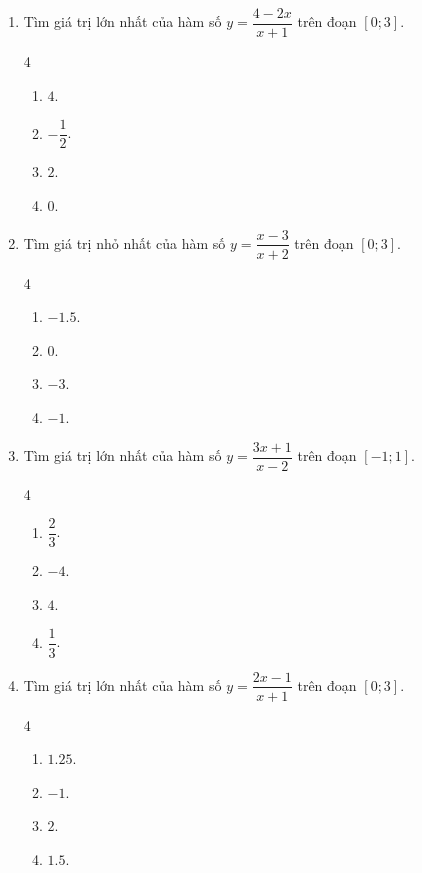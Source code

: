 \documentclass[12pt]{article}
\begin{document}
\begin{enumerate}[label=\textbf{Câu \arabic*.}]
		\item Tìm giá trị lớn nhất của hàm số $y = \dfrac{4 - 2x}{x + 1}$ trên đoạn $[0; 3]$.
		\begin{multicols}{4}
			\begin{enumerate}[label=\textbf{\Alph*.}]
				\item $4$.
				\item $-\dfrac{1}{2}$.
				\item $2$.
				\item $0$.
			\end{enumerate}
		\end{multicols}
		
		\item Tìm giá trị nhỏ nhất của hàm số $y = \dfrac{x - 3}{x + 2}$ trên đoạn $[0; 3]$.
		\begin{multicols}{4}
			\begin{enumerate}[label=\textbf{\Alph*.}]
				\item $-1.5$.
				\item $0$.
				\item $-3$.
				\item $-1$.
			\end{enumerate}
		\end{multicols}
		
		\item Tìm giá trị lớn nhất của hàm số $y = \dfrac{3x + 1}{x - 2}$ trên đoạn $[-1; 1]$.
		\begin{multicols}{4}
			\begin{enumerate}[label=\textbf{\Alph*.}]
				\item $\dfrac{2}{3}$.
				\item $-4$.
				\item $4$.
				\item $\dfrac{1}{3}$.
			\end{enumerate}
		\end{multicols}
		
		\item Tìm giá trị lớn nhất của hàm số $y = \dfrac{2x - 1}{x + 1}$ trên đoạn $[0; 3]$.
		\begin{multicols}{4}
			\begin{enumerate}[label=\textbf{\Alph*.}]
				\item $1.25$.
				\item $-1$.
				\item $2$.
				\item $1.5$.
			\end{enumerate}
		\end{multicols}
		

\end{enumerate}
\end{document}
